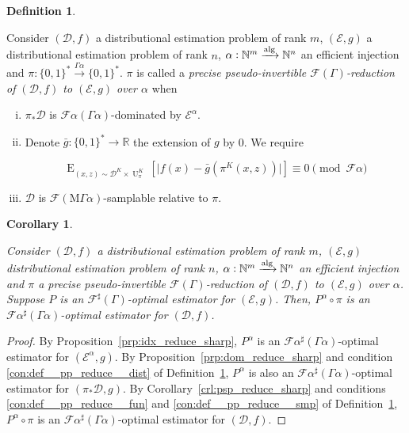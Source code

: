 \documentclass{article}
\numberwithin{equation}{section}
\theoremstyle{definition}
\newtheorem{definition}{Definition}[section]
\theoremstyle{plain}
\newtheorem{corollary}{Corollary}[section]
\newcommand{\Bool}{\{0,1\}}
\newcommand{\Words}{{\Bool^*}}
\DeclareMathOperator{\E}{E}
\DeclareMathOperator{\Un}{U}
\newcommand{\Nats}{\mathbb{N}}
\newcommand{\Reals}{\mathbb{R}}
\newcommand{\Abs}[1]{\lvert #1 \rvert}
\newcommand{\Dist}{\mathcal{D}}
\newcommand{\MGrow}{\mathrm{M}\Gamma}
\newcommand{\Fall}{\mathcal{F}}
\newcommand{\EG}{\Fall(\Gamma)}
\newcommand{\ESG}{\Fall^\sharp(\Gamma)}
\newcommand{\Alg}{\xrightarrow{\textnormal{alg}}}
\begin{document}
\begin{samepage}
\begin{definition}
\label{def:pp_reduce}

Consider $(\Dist,f)$ a distributional estimation problem of rank ${m}$, $(\mathcal{E},g)$ a distributional estimation problem of rank ${n}$, ${\alpha: \Nats^m \Alg \Nats^n}$ an efficient injection and ${\pi: \Words \xrightarrow{\Gamma \alpha} \Words}$. $\pi$ is called a \emph{precise pseudo-invertible $\EG$-reduction of $(\Dist,f)$ to $(\mathcal{E},g)$ over ${\alpha}$} when

\begin{enumerate}[(i)]

\item\label{con:def__pp_reduce__dist} ${\pi_*\Dist}$ is ${\Fall \alpha(\Gamma \alpha)}$-dominated by ${\mathcal{E}^\alpha}$.

\item\label{con:def__pp_reduce__fun} Denote ${\bar{g}: \Words \rightarrow \Reals}$ the extension of $g$ by 0. We require

\[\E_{(x,z) \sim \Dist^{K} \times \Un_\pi^{K}}[\Abs{f(x)-\bar{g}(\pi^{K}(x,z))}] \equiv 0 \pmod {\Fall \alpha}\]

\item\label{con:def__pp_reduce__smp} $\Dist$ is $\Fall(\MGrow \alpha)$-samplable relative to $\pi$.

\end{enumerate}

\end{definition}
\end{samepage}

\begin{samepage}
\begin{corollary}
\label{crl:pp_reduce_sharp}

Consider $(\Dist,f)$ a distributional estimation problem of rank ${m}$, $(\mathcal{E},g)$ distributional estimation problem of rank ${n}$, ${\alpha: \Nats^m \Alg \Nats^n}$ an efficient injection and $\pi$ a precise pseudo-invertible $\EG$-reduction of $(\Dist, f)$ to $(\mathcal{E}, g)$ over ${\alpha}$. Suppose $P$ is an $\ESG$-optimal estimator for $(\mathcal{E}, g)$. Then, $P^\alpha \circ \pi$ is an $\Fall \alpha^\sharp (\Gamma \alpha)$-optimal estimator for $(\Dist, f)$.

\end{corollary}
\end{samepage}

\begin{proof}

By Proposition~\ref{prp:idx_reduce_sharp}, ${P^\alpha}$ is an ${\Fall \alpha^\sharp(\Gamma \alpha)}$-optimal estimator for ${(\mathcal{E}^\alpha, g)}$. By Proposition~\ref{prp:dom_reduce_sharp} and condition \ref{con:def__pp_reduce__dist} of Definition~\ref{def:pp_reduce}, ${P^\alpha}$ is also an ${\Fall \alpha^\sharp(\Gamma \alpha)}$-optimal estimator for ${(\pi_* \Dist, g)}$. By Corollary~\ref{crl:psp_reduce_sharp} and conditions \ref{con:def__pp_reduce__fun} and \ref{con:def__pp_reduce__smp} of Definition~\ref{def:pp_reduce}, ${P^\alpha \circ \pi}$ is an ${\Fall \alpha^\sharp(\Gamma \alpha)}$-optimal estimator for ${(\Dist, f)}$.
%
\end{proof}
\end{document}
